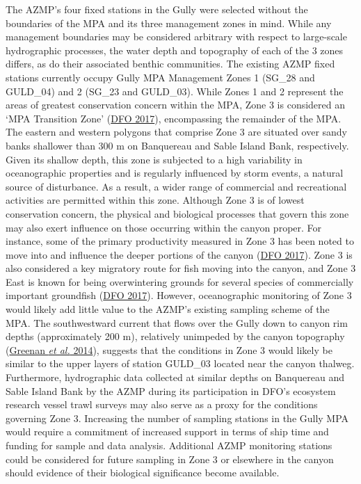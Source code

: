 \documentclass[12pt]{article}\usepackage[]{graphicx}\usepackage[]{color}
\begin{document}
The AZMP's four fixed stations in the Gully were selected without the boundaries of the MPA and its three management zones in mind. While any management boundaries may be considered arbitrary with respect to large-scale hydrographic processes, the water depth and topography of each of the 3 zones differs, as do their associated benthic communities. The existing AZMP fixed stations currently occupy Gully MPA Management Zones 1 (SG\_28 and GULD\_04) and 2 (SG\_23 and GULD\_03). While Zones 1 and 2 represent the areas of greatest conservation concern within the MPA, Zone 3 is considered an `MPA Transition Zone' (\protect\hyperlink{ref-dfo_2017}{DFO 2017}), encompassing the remainder of the MPA. The eastern and western polygons that comprise Zone 3 are situated over sandy banks shallower than 300 m on Banquereau and Sable Island Bank, respectively. Given its shallow depth, this zone is subjected to a high variability in oceanographic properties and is regularly influenced by storm events, a natural source of disturbance. As a result, a wider range of commercial and recreational activities are permitted within this zone. Although Zone 3 is of lowest conservation concern, the physical and biological processes that govern this zone may also exert influence on those occurring within the canyon proper. For instance, some of the primary productivity measured in Zone 3 has been noted to move into and influence the deeper portions of the canyon (\protect\hyperlink{ref-dfo_2017}{DFO 2017}). Zone 3 is also considered a key migratory route for fish moving into the canyon, and Zone 3 East is known for being overwintering grounds for several species of commercially important groundfish (\protect\hyperlink{ref-dfo_2017}{DFO 2017}). However, oceanographic monitoring of Zone 3 would likely add little value to the AZMP's existing sampling scheme of the MPA. The southwestward current that flows over the Gully down to canyon rim depths (approximately 200 m), relatively unimpeded by the canyon topography (\protect\hyperlink{ref-greenan_2014}{Greenan \textit{et al.} 2014}), suggests that the conditions in Zone 3 would likely be similar to the upper layers of station GULD\_03 located near the canyon thalweg. Furthermore, hydrographic data collected at similar depths on Banquereau and Sable Island Bank by the AZMP during its participation in DFO's ecosystem research vessel trawl surveys may also serve as a proxy for the conditions governing Zone 3. Increasing the number of sampling stations in the Gully MPA would require a commitment of increased support in terms of ship time and funding for sample and data analysis. Additional AZMP monitoring stations could be considered for future sampling in Zone 3 or elsewhere in the canyon should evidence of their biological significance become available.
\end{document}
